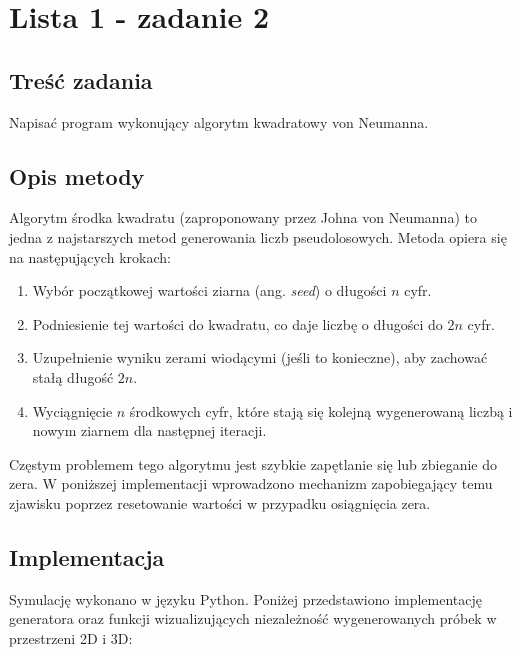 \documentclass[12pt, a4paper]{article}
\begin{document}
\section{Lista 1 - zadanie 2}
\subsection{Treść zadania}
Napisać program wykonujący algorytm kwadratowy von Neumanna.

\subsection{Opis metody}
Algorytm środka kwadratu (zaproponowany przez Johna von Neumanna) to jedna z najstarszych metod generowania liczb pseudolosowych. Metoda opiera się na następujących krokach:
\begin{enumerate}
    \item Wybór początkowej wartości ziarna (ang. \textit{seed}) o długości $n$ cyfr.
    \item Podniesienie tej wartości do kwadratu, co daje liczbę o długości do $2n$ cyfr.
    \item Uzupełnienie wyniku zerami wiodącymi (jeśli to konieczne), aby zachować stałą długość $2n$.
    \item Wyciągnięcie $n$ środkowych cyfr, które stają się kolejną wygenerowaną liczbą i nowym ziarnem dla następnej iteracji.
\end{enumerate}
Częstym problemem tego algorytmu jest szybkie zapętlanie się lub zbieganie do zera. W poniższej implementacji wprowadzono mechanizm zapobiegający temu zjawisku poprzez resetowanie wartości w przypadku osiągnięcia zera.

\subsection{Implementacja}
Symulację wykonano w języku Python. Poniżej przedstawiono implementację generatora oraz funkcji wizualizujących niezależność wygenerowanych próbek w przestrzeni 2D i 3D:
\end{document}
